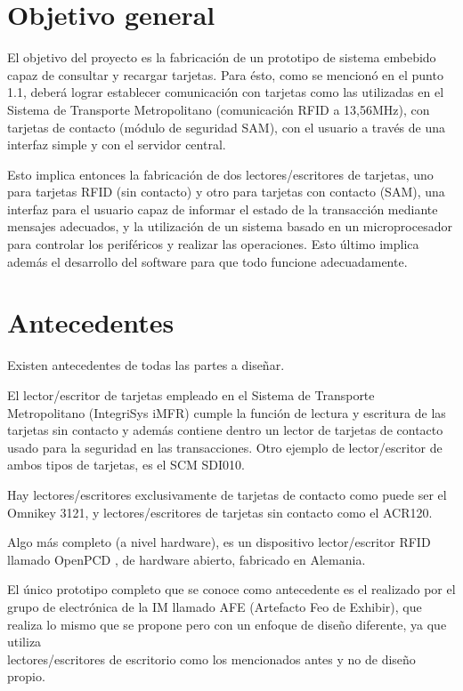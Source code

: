 \section{Objetivo general}

El objetivo del proyecto es la fabricación de un prototipo de sistema embebido capaz de consultar y recargar tarjetas. Para ésto, como se mencionó en el punto 1.1, deberá lograr establecer comunicación con tarjetas  como las utilizadas en el Sistema de Transporte Metropolitano (comunicación RFID a 13,56MHz), con tarjetas de contacto (módulo de seguridad SAM), con el usuario a través de una interfaz simple y con el servidor central.

\bigskip
Esto implica entonces la fabricación de dos lectores/escritores de tarjetas, uno para tarjetas RFID (sin contacto) y otro para tarjetas con contacto (SAM), una interfaz para el usuario capaz de informar el estado de la transacción mediante mensajes adecuados, y la utilización de un sistema basado en un microprocesador para controlar los periféricos y realizar las operaciones. Esto último implica además el desarrollo del software para que todo funcione adecuadamente.


\section{Antecedentes}

Existen antecedentes de todas las partes a diseñar.

\bigskip
El lector/escritor de tarjetas empleado en el Sistema de Transporte Metropolitano (IntegriSys iMFR) cumple la función de lectura y escritura de las tarjetas sin contacto y además contiene dentro un lector de tarjetas de contacto usado para la seguridad en las transacciones. Otro ejemplo de lector/escritor de ambos tipos de tarjetas,  es el SCM SDI010.

\bigskip
Hay lectores/escritores exclusivamente de tarjetas de contacto como puede ser el Omnikey 3121, y lectores/escritores de tarjetas sin contacto como el ACR120.

\bigskip
Algo más completo (a nivel hardware), es un dispositivo lector/escritor RFID llamado OpenPCD \cite{OpenPCD}, de hardware abierto, fabricado en Alemania.

\bigskip
El único prototipo completo que se conoce como antecedente es el realizado por el grupo de electrónica de la IM llamado AFE (Artefacto Feo de Exhibir), que realiza lo mismo que se propone pero con un enfoque de diseño diferente, ya que utiliza \\
lectores/escritores de escritorio como los mencionados antes y no de diseño propio.


